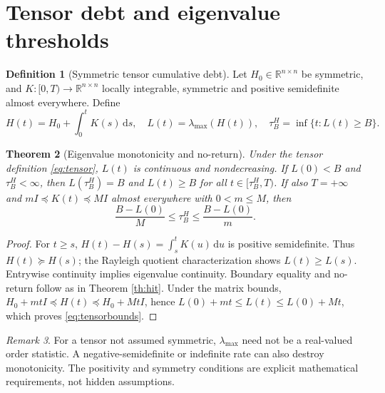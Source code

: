 \documentclass[11pt,letterpaper]{article}
\newtheorem{theorem}{Theorem}[section]
\theoremstyle{definition}\newtheorem{definition}[theorem]{Definition}\newtheorem{example}[theorem]{Example}
\theoremstyle{remark}\newtheorem{remark}[theorem]{Remark}
\newcommand{\R}{\mathbb R}\newcommand{\dd}{\mathrm d}\newcommand{\ess}{\operatorname{ess}}
\begin{document}
\section{Tensor debt and eigenvalue thresholds}
\begin{definition}[Symmetric tensor cumulative debt]
Let $H_0\in\R^{n\times n}$ be symmetric, and $K:[0,T)\to\R^{n\times n}$ locally integrable, symmetric and positive semidefinite almost everywhere. Define
\begin{equation}\label{eq:tensor}
H(t)=H_0+\int_0^t K(s)\,\dd s,\quad L(t)=\lambda_{\max}(H(t)),\quad
\tau_B^H=\inf\{t:L(t)\geq B\}.
\end{equation}
\end{definition}
\begin{theorem}[Eigenvalue monotonicity and no-return]\label{th:tensor}
Under the tensor definition \eqref{eq:tensor}, $L(t)$ is continuous and nondecreasing. If $L(0)<B$ and $\tau_B^H<\infty$, then $L(\tau_B^H)=B$ and $L(t)\geq B$ for all $t\in[\tau_B^H,T)$. If also $T=+\infty$ and $mI\preceq K(t)\preceq MI$ almost everywhere with $0<m\leq M$, then
\begin{equation}\label{eq:tensorbounds}
\frac{B-L(0)}{M}\leq\tau_B^H\leq\frac{B-L(0)}{m}.
\end{equation}
\end{theorem}
\begin{proof}
For $t\geq s$, $H(t)-H(s)=\int_s^t K(u)\,\dd u$ is positive semidefinite. Thus $H(t)\succeq H(s)$; the Rayleigh quotient characterization shows $L(t)\geq L(s)$. Entrywise continuity implies eigenvalue continuity. Boundary equality and no-return follow as in Theorem \ref{th:hit}. Under the matrix bounds, $H_0+mtI\preceq H(t)\preceq H_0+MtI$, hence $L(0)+mt\leq L(t)\leq L(0)+Mt$, which proves \eqref{eq:tensorbounds}.
\end{proof}
\begin{remark}
For a tensor not assumed symmetric, $\lambda_{\max}$ need not be a real-valued order statistic. A negative-semidefinite or indefinite rate can also destroy monotonicity. The positivity and symmetry conditions are explicit mathematical requirements, not hidden assumptions.
\end{remark}
\end{document}
